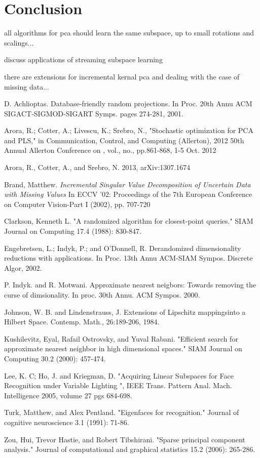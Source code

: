 \documentclass[11pt,letterpaper]{article}
\begin{document}
\section{Conclusion}

all algorithms for pca should learn the same subspace, up to small rotations and scalings...

discuss applications of streaming subspace learning

there are extensions for incremental kernal pca and dealing with the case of missing data...

\begin{thebibliography}{20}


  D. Achlioptas. Database-friendly random projections. In Proc. 20th Annu ACM SIGACT-SIGMOD-SIGART Symps. pages 274-281, 2001. 
  
  Arora, R.; Cotter, A.; Livescu, K.; Srebro, N., "Stochastic optimization for PCA and PLS," in Communication, Control, and Computing (Allerton), 2012 50th Annual Allerton Conference on , vol., no., pp.861-868, 1-5 Oct. 2012
  
   Arora, R., Cotter, A., and Srebro, N. 2013, arXiv:1307.1674 
  
  Brand, Matthew. {\em Incremental Singular Value Decomposition of Uncertain Data with Missing Values} In ECCV '02: Proceedings of the 7th European Conference on Computer Vision-Part I (2002), pp. 707-720
  
  Clarkson, Kenneth L. "A randomized algorithm for closest-point queries." SIAM Journal on Computing 17.4 (1988): 830-847.
  
  Engebretsen, L.; Indyk, P.; and O'Donnell, R. Derandomized dimensionality reductions with applications. In Proc. 13th Annu ACM-SIAM Sympos. Discrete Algor, 2002. 
  
    P. Indyk. and R. Motwani. Approximate nearest neigbors: Towards removing the curse of dimsionality. In proc. 30th Annu. ACM Sympos. 2000.
  
  Johnson, W. B. and Lindenstrauss, J. Extensions of Lipschitz mappingsinto a Hilbert Space. Contemp. Math., 26:189-206, 1984.
  
  Kushilevitz, Eyal, Rafail Ostrovsky, and Yuval Rabani. "Efficient search for approximate nearest neighbor in high dimensional spaces." SIAM Journal on Computing 30.2 (2000): 457-474.
 
 Lee, K. C; Ho, J. and Kriegman, D. "Acquiring Linear Subspaces for Face Recognition under Variable Lighting ", IEEE Trans. Pattern Anal. Mach. Intelligence 2005, volume 27 pgs 684-698.  
 
 Turk, Matthew, and Alex Pentland. "Eigenfaces for recognition." Journal of cognitive neuroscience 3.1 (1991): 71-86.
  
  Zou, Hui, Trevor Hastie, and Robert Tibshirani. "Sparse principal component analysis." Journal of computational and graphical statistics 15.2 (2006): 265-286.
  
  \end{thebibliography}
\end{document}
